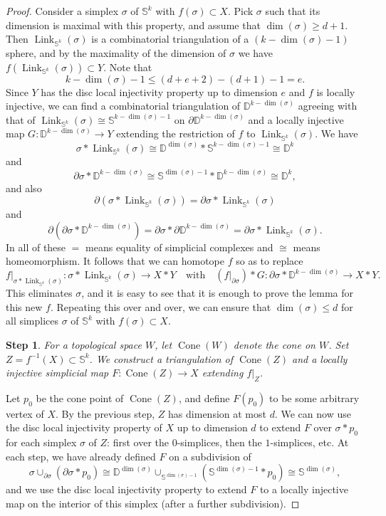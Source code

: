 \documentclass[11pt]{amsart}
\numberwithin{equation}{section}
\theoremstyle{plain}
\newtheorem{stepsa}{Step}
\theoremstyle{definition}
\theoremstyle{remark}
\newcommand\bbD{\ensuremath{\mathbb{D}}}
\newcommand\bbS{\ensuremath{\mathbb{S}}}
\DeclareMathOperator{\Link}{Link}
\DeclareMathOperator{\Cone}{Cone}
\begin{document}
\begin{proof}
Consider a simplex $\sigma$ of $\bbS^k$ with $f(\sigma) \subset X$.  Pick $\sigma$ such that its dimension is maximal
with this property, and assume that $\dim(\sigma) \geq d+1$.  Then $\Link_{\bbS^k}(\sigma)$ is a combinatorial
triangulation of a $(k-\dim(\sigma)-1)$ sphere, and by the maximality of the dimension of $\sigma$ we have
$f(\Link_{\bbS^k}(\sigma)) \subset Y$.  Note that
\[k-\dim(\sigma)-1 \leq (d+e+2) - (d+1) -1 = e.\]
Since $Y$ has the disc local injectivity property up to dimension $e$ and $f$ is locally injective, we can
find a combinatorial triangulation of $\bbD^{k-\dim(\sigma)}$ agreeing with that of $\Link_{\bbS^k}(\sigma) \cong \bbS^{k-\dim(\sigma)-1}$ on
$\partial \bbD^{k-\dim(\sigma)}$ and a locally injective map $G\colon \bbD^{k-\dim(\sigma)} \rightarrow Y$
extending the restriction of $f$ to $\Link_{\bbS^k}(\sigma)$.  We have
\[\sigma \ast \Link_{\bbS^k}\left(\sigma\right) \cong \bbD^{\dim(\sigma)} \ast \bbS^{k-\dim(\sigma)-1} \cong \bbD^k\]
and
\[\partial \sigma \ast \bbD^{k-\dim(\sigma)} \cong \bbS^{\dim(\sigma)-1} \ast \bbD^{k-\dim(\sigma)} \cong \bbD^k,\]
and also
\[\partial\left(\sigma \ast \Link_{\bbS^k}\left(\sigma\right)\right) = \partial \sigma \ast \Link_{\bbS^k}\left(\sigma\right)\]
and
\[\partial\left(\partial \sigma \ast \bbD^{k-\dim(\sigma)}\right) = \partial \sigma \ast \partial \bbD^{k-\dim(\sigma)} = \partial \sigma \ast \Link_{\bbS^k}(\sigma).\]
In all of these $=$ means equality of simplicial complexes and $\cong$ means homeomorphism.  It follows that we can homotope
$f$ so as to replace 
\[f|_{\sigma \ast \Link_{\bbS^k}(\sigma)}\colon \sigma \ast \Link_{\bbS^k}(\sigma) \rightarrow X \ast Y \quad \text{with} \quad \left(f|_{\partial \sigma}\right) \ast G \colon \partial \sigma \ast \bbD^{k-\dim(\sigma)} \rightarrow X \ast Y.\]
This eliminates $\sigma$, and it is easy to see that it is enough to prove the lemma for this new $f$.
Repeating this over and over, we can ensure that $\dim(\sigma) \leq d$ for all simplices $\sigma$ of $\bbS^k$ with $f(\sigma) \subset X$.

\begin{stepsa}
For a topological space $W$, let $\Cone(W)$ denote the cone on $W$.  
Set $Z = f^{-1}(X) \subset \bbS^k$.  We construct a triangulation of $\Cone(Z)$ and a locally injective
simplicial map $F\colon \Cone(Z) \rightarrow X$ extending $f|_Z$.
\end{stepsa}

Let $p_0$ be the cone point of $\Cone(Z)$, and define $F(p_0)$ to be some arbitrary vertex of $X$.  By the previous
step, $Z$ has dimension at most $d$.  We can now use the disc local injectivity property of $X$ up to dimension $d$
to extend $F$ over $\sigma \ast p_0$ for each simplex $\sigma$ of $Z$: first over the $0$-simplices, then the
$1$-simplices, etc.  At each step, we have already defined $F$ on a subdivision of
\[\sigma \cup_{\partial \sigma} \left(\partial \sigma \ast p_0\right) \cong \bbD^{\dim(\sigma)} \cup_{\bbS^{\dim(\sigma)-1}} \left(\bbS^{\dim(\sigma)-1} \ast p_0\right) \cong \bbS^{\dim(\sigma)},\]
and we use the disc local injectivity property to extend $F$ to a locally injective map on the interior of this simplex (after a
further subdivision).


\end{proof}
\end{document}
